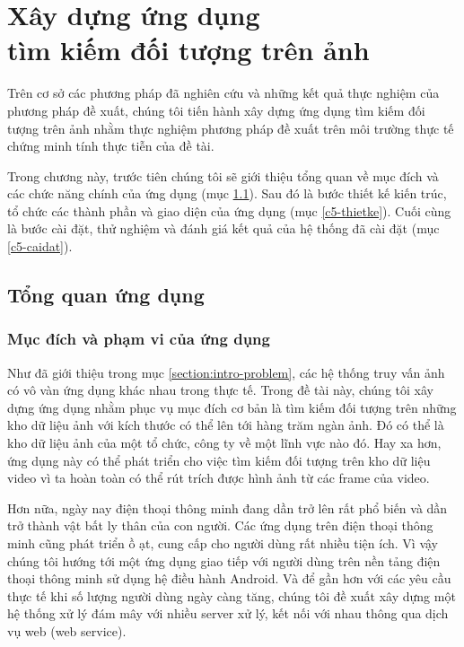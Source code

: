 \chapter[Xây dựng ứng dụng\\tìm kiếm đối tượng trên ảnh]{Xây dựng ứng dụng\\tìm kiếm đối tượng trên ảnh}
\label{chapter:application}
\ifpdf
    \graphicspath{{Chapter5/Chapter5Figs/PNG/}{Chapter5/Chapter5Figs/PDF/}{Chapter5/Chapter5Figs/}}
\else
    \graphicspath{{Chapter5/Chapter5Figs/EPS/}{Chapter5/Chapter5Figs/}}
\fi
{}

Trên cơ sở các phương pháp đã nghiên cứu và những kết quả thực nghiệm của phương pháp đề xuất, chúng tôi tiến hành xây dựng ứng dụng tìm kiếm đối tượng trên ảnh nhằm thực nghiệm phương pháp đề xuất trên môi trường thực tế chứng minh tính thực tiễn của đề tài.

Trong chương này, trước tiên chúng tôi sẽ giới thiệu tổng quan về mục đích và các chức năng chính của ứng dụng (mục \ref{c5-tongquan}). Sau đó là bước thiết kế kiến trúc, tổ chức các thành phần và giao diện của ứng dụng (mục \ref{c5-thietke}). Cuối cùng là bước cài đặt, thử nghiệm và đánh giá kết quả của hệ thống đã cài đặt (mục \ref{c5-caidat}).

\section{Tổng quan ứng dụng}
\label{c5-tongquan}

	\subsection{Mục đích và phạm vi của ứng dụng}
Như đã giới thiệu trong mục \ref{section:intro-problem}, các hệ thống truy vấn ảnh có vô vàn ứng dụng khác nhau trong thực tế. Trong đề tài này, chúng tôi xây dựng ứng dụng nhằm phục vụ mục đích cơ bản là tìm kiếm đối tượng trên những kho dữ liệu ảnh với kích thước có thể lên tới hàng trăm ngàn ảnh. Đó có thể là kho dữ liệu ảnh của một tổ chức, công ty về một lĩnh vực nào đó. Hay xa hơn, ứng dụng này có thể phát triển cho việc tìm kiếm đối tượng trên kho dữ liệu video vì ta hoàn toàn có thể rút trích được hình ảnh từ các frame của video.

Hơn nữa, ngày nay điện thoại thông minh đang dần trở lên rất phổ biến và dần trở thành vật bất ly thân của con người. Các ứng dụng trên điện thoại thông minh cũng phát triển ồ ạt, cung cấp cho người dùng rất nhiều tiện ích. Vì vậy chúng tôi hướng tới một ứng dụng giao tiếp với người dùng trên nền tảng điện thoại thông minh sử dụng hệ điều hành Android. Và để gần hơn với các yêu cầu thực tế khi số lượng người dùng ngày càng tăng, chúng tôi đề xuất xây dựng một hệ thống xử lý đám mây với nhiều server xử lý, kết nối với nhau thông qua dịch vụ web (web service).
	

